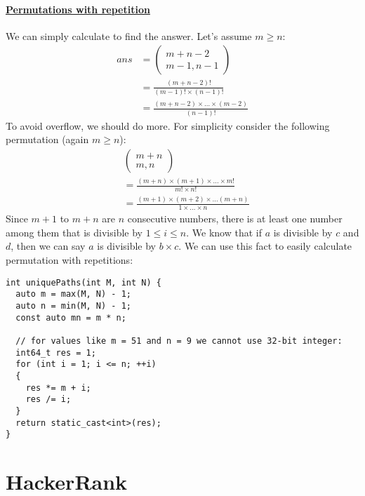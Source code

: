 \documentclass{book}
\begin{document}
	\subsubsection{\href{https://en.wikipedia.org/wiki/Permutation\#Permutations_with_repetition}{Permutations with repetition}}
	We can simply calculate to find the answer. Let's assume $m \ge n$:
	\begin{equation*}
		\begin{split}
		ans &= \begin{pmatrix}
			m + n - 2 \\
			m - 1,n - 1
		\end{pmatrix} \\
		&= \frac{(m + n -2)!}{(m - 1)! \times (n - 1)!} \\
		&= \frac{(m + n - 2) \times \dots \times (m - 2)}{(n - 1)!}
		\end{split}
	\end{equation*}
	To avoid overflow, we should do more. For simplicity consider the following permutation (again $m \ge n$):
	\begin{equation*}
		\begin{split}
			&\begin{pmatrix}
				m + n \\
				m, n				
			\end{pmatrix} \\
		&= \frac{(m + n) \times (m + 1) \times \dots \times m!}{m! \times n!} \\
		&= \frac{(m + 1) \times (m + 2) \times \dots (m + n)}{1 \times \dots \times n}
		\end{split}
	\end{equation*}
	Since $m + 1$ to $m + n$ are $n$ consecutive numbers, there is at least one number among them that is divisible by $1 \le i \le n$. We know that if $a$ is divisible by $c$ and $d$, then we can say $a$ is divisible by $b \times c$. We can use this fact to easily calculate permutation with repetitions:
	\begin{lstlisting}
int uniquePaths(int M, int N) {
  auto m = max(M, N) - 1;
  auto n = min(M, N) - 1;
  const auto mn = m * n;
  
  // for values like m = 51 and n = 9 we cannot use 32-bit integer:
  int64_t res = 1;
  for (int i = 1; i <= n; ++i)
  {
    res *= m + i;
    res /= i;
  }
  return static_cast<int>(res);
}
	\end{lstlisting}
	\chapter{HackerRank}
\end{document}
